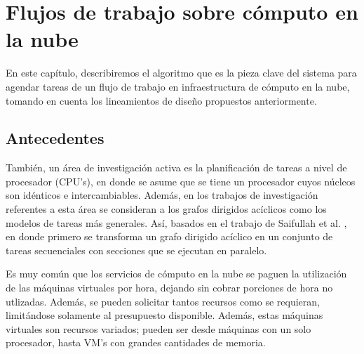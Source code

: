 \chapter{Flujos de trabajo sobre cómputo en la nube}
\label{chap:algorithm}

En este capítulo, describiremos el algoritmo que es la pieza clave del sistema para agendar tareas de un flujo de trabajo en infraestructura de cómputo en la nube, tomando en cuenta los lineamientos de diseño propuestos anteriormente.



\section{Antecedentes}

También, un área de investigación activa es la planificación de tareas a nivel de procesador (CPU's), en donde se asume que se tiene un procesador cuyos núcleos son idénticos e intercambiables. Además, en los trabajos de investigación referentes a esta área se consideran a los grafos dirigidos acíclicos como los modelos de tareas más generales. Así, basados en el trabajo de Saifullah et al. \cite{saifullah2013multi}, en donde primero se transforma un grafo dirigido acíclico en un conjunto de tareas secuenciales con secciones que se ejecutan en paralelo.







Es muy común que los servicios de cómputo en la nube se paguen la utilización de las máquinas virtuales por hora, dejando sin cobrar porciones de hora no utlizadas. Además, se pueden solicitar tantos recursos como se requieran, limitándose solamente al presupuesto disponible. Además, estas máquinas virtuales son recursos variados; pueden ser desde máquinas con un solo procesador, hasta VM's con grandes cantidades de memoria.

